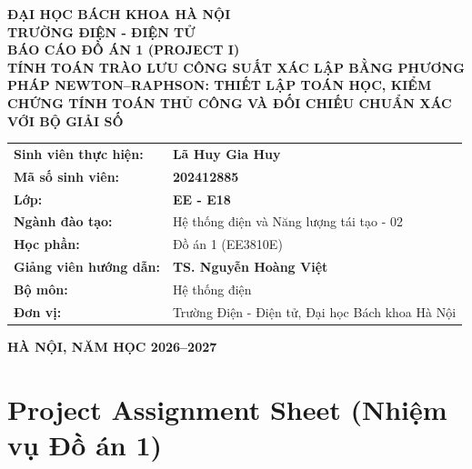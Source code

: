 \documentclass[12pt,a4paper,oneside]{report}
\begin{document}
\begin{titlepage}
\begin{center}
    {\large \textbf{ĐẠI HỌC BÁCH KHOA HÀ NỘI}}\\[4pt]
    {\large \textbf{TRƯỜNG ĐIỆN - ĐIỆN TỬ}}\\[45pt]

    {\Large \textbf{BÁO CÁO ĐỒ ÁN 1 (PROJECT I)}}\\[15pt]
    {\LARGE \textbf{TÍNH TOÁN TRÀO LƯU CÔNG SUẤT XÁC LẬP BẰNG PHƯƠNG PHÁP NEWTON--RAPHSON: THIẾT LẬP TOÁN HỌC, KIỂM CHỨNG TÍNH TOÁN THỦ CÔNG VÀ ĐỐI CHIẾU CHUẨN XÁC VỚI BỘ GIẢI SỐ}}\\[40pt]

    \begin{tabular}{ll}
        \textbf{Sinh viên thực hiện:} & \textbf{Lã Huy Gia Huy} \\
        \textbf{Mã số sinh viên:} & \textbf{202412885} \\
        \textbf{Lớp:} & \textbf{EE - E18} \\
        \textbf{Ngành đào tạo:} & Hệ thống điện và Năng lượng tái tạo - 02 \\
        \textbf{Học phần:} & Đồ án 1 (EE3810E) \\[14pt]
        \textbf{Giảng viên hướng dẫn:} & \textbf{TS. Nguyễn Hoàng Việt} \\
        \textbf{Bộ môn:} & Hệ thống điện \\
        \textbf{Đơn vị:} & Trường Điện - Điện tử, Đại học Bách khoa Hà Nội \\
    \end{tabular}

    \vfill
    {\large \textbf{HÀ NỘI, NĂM HỌC 2026--2027}}
\end{center}
\end{titlepage}


\chapter*{Project Assignment Sheet (Nhiệm vụ Đồ án 1)}
\end{document}
